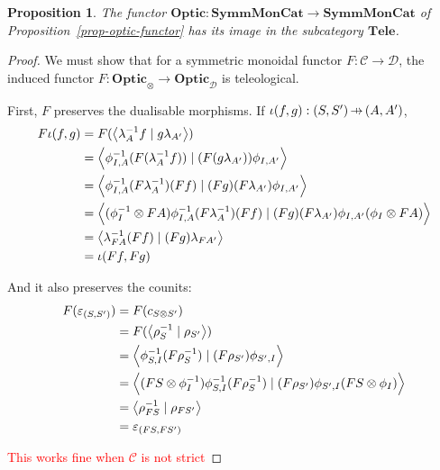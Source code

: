 \documentclass[11pt,a4paper]{article}
\theoremstyle{plain}
\newtheorem{proposition}[theorem]{Proposition}
\theoremstyle{definition}
\newcommand{\C}{\mathscr{C}}
\newcommand{\D}{\mathscr{D}}
\newcommand{\SymmMonCat}{\mathbf{SymmMonCat}}
\newcommand{\Tele}{\mathbf{Tele}}
\newcommand{\Optic}{\mathbf{Optic}}
\newcommand{\rep}[2]{{\ensuremath \left\langle #1 \mid #2 \right\rangle}}
\newcommand{\hto}{\ensuremath{\,\mathaccent\shortmid\rightarrow\,}}
\newcommand{\todo}[1]{\textcolor{red}{\small #1}}
\begin{document}

\begin{proposition}
  The functor $\Optic : \SymmMonCat \to \SymmMonCat$ of Proposition~\ref{prop-optic-functor} has its image in the subcategory $\Tele$.
\end{proposition}
\begin{proof}
  We must show that for a symmetric monoidal functor $F : \C \to \D$, the induced functor $F : \Optic_\otimes \to \Optic_\D$ is teleological.

  First, $F$ preserves the dualisable morphisms. If $\iota(f, g) : (S, S') \hto (A, A')$,
  \begin{align*}
    F\iota(f, g)
    &= F(\rep{\lambda_A^{-1} f}{g \lambda_{A'}}) \\
    &= \rep{\phi^{-1}_{I,A} (F(\lambda_A^{-1} f))}{(F(g \lambda_{A'})) \phi_{I,A'}} \\
    &= \rep{\phi^{-1}_{I,A} (F\lambda_A^{-1}) (Ff)}{(Fg)(F \lambda_{A'}) \phi_{I,A'}} \\
    &= \rep{(\phi^{-1}_I \otimes FA) \phi^{-1}_{I,A} (F\lambda_A^{-1}) (Ff)}{(Fg)(F \lambda_{A'}) \phi_{I,A'} (\phi_I \otimes FA)} \\
    &= \rep{\lambda_{FA}^{-1} (Ff)}{(Fg)\lambda_{FA'}} \\
    &= \iota(Ff, Fg)
  \end{align*}

  And it also preserves the counits:
  \begin{align*}
    F(\varepsilon_{(S, S')})
    &= F(c_{S \otimes S'}) \\
    &= F(\rep{\rho_S^{-1}}{\rho_{S'}}) \\
    &= \rep{\phi^{-1}_{S,I} (F \rho_S^{-1})}{(F \rho_{S'}) \phi_{S',I}} \\
    &= \rep{(FS \otimes \phi_I^{-1}) \phi^{-1}_{S,I} (F \rho_S^{-1})}{(F \rho_{S'}) \phi_{S',I} (FS \otimes \phi_I)} \\
    &= \rep{\rho_{FS}^{-1}}{\rho_{FS'} } \\
    &= \varepsilon_{(FS, FS')}
  \end{align*}

  \todo{This works fine when $\C$ is not strict}
\end{proof}
\end{document}

